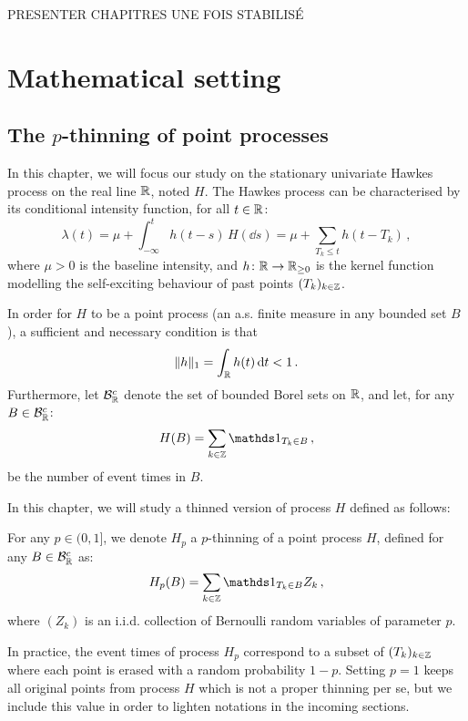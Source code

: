 PRESENTER CHAPITRES UNE FOIS STABILISÉ

\section{Mathematical setting}\label{sec:chap5_mathsetting}

\subsection{The $p$-thinning of point processes}\label{sec:chap5_hawkesprocess}

In this chapter, we will focus our study on the stationary univariate Hawkes process on the real line ${\mathbb R}$, noted $H$.
The Hawkes process can be characterised by its conditional intensity function, for all $t\in{\mathbb R}$:
\begin{equation}\label{eq:chap5_hawkes_intensity}
    \lambda(t) = \mu + \int_{-\infty}^{t}{h(t-s)\,H(\dd s)} = \mu + \sum_{T_k \leq t}{h(t-T_k)}\,,
\end{equation}
where $\mu > 0$ is the baseline intensity, and $h\colon{\mathbb R}\to {\mathbb R}_{\geq 0}$ is the kernel function modelling the self-exciting behaviour of past points $(T_k)_{k\in{\mathbb Z}}$.

In order for $H$ to be a point process (\ie an a.s. finite measure in any bounded set $B$), 
a sufficient and necessary condition \parencite{Hawkes1971} is that 
\[\|h\|_1 = \int_{{\mathbb R}}{h(t)\,{\mathrm{d}} t} < 1\,.\]
Furthermore, let $\mathcal{B}_{{\mathbb R}}^c$ denote the set of bounded Borel sets on ${\mathbb R}$, and let, for any $B\in\mathcal{B}_{{\mathbb R}}^c$:
\[H(B) = \sum_{k\in\ZZ}{\II_{T_k \in B}}\,,\]
be the number of event times in $B$. 

In this chapter, we will study a thinned version of process $H$ defined as follows:
\begin{definition}\label{def:chap5_thinning}
For any $p\in(0,1]$, we denote $H_p$ a $p$-thinning of a point process $H$, defined for any $B\in\mathcal{B}_{{\mathbb R}}^c$ as:
\[H_p(B) = \sum_{k\in\ZZ}{\II_{T_k \in B} Z_k}\,,\]
where $(Z_k)$ is an i.i.d. collection of Bernoulli random variables of parameter $p$.
\end{definition}

In practice, the event times of process $H_p$ correspond to a subset of $(T_k)_{k\in{\mathbb Z}}$ where each point
is erased with a random probability $1-p$. 
Setting $p = 1$ keeps all original points from process $H$ which is not a proper thinning per se,
but we include this value in order to lighten notations in the incoming sections. 

